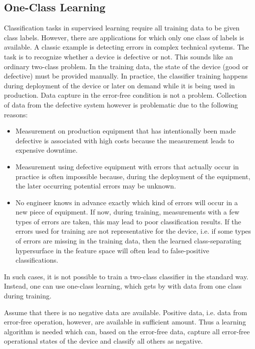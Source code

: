 \documentclass[10pt]{book}
\begin{document}
\subsection{One-Class Learning}
Classification tasks in supervised learning require all training data to be given class labels. However, there are applications for which only one class of labels is available. A classic example is detecting errors in complex technical systems. The task is to recognize whether a device is defective or not. This sounds like an ordinary two-class problem. In the training data, the state of the device (good or defective) must be provided manually. In practice, the classifier training happens during deployment of the device or later on demand while it is being used in production. Data capture in the error-free condition is not a problem. Collection of data from the defective system however is problematic due to the following reasons:
\begin{itemize}
  \item Measurement on production equipment that has intentionally been made defective is associated with high costs because the measurement leads to expensive downtime.
  \item Measurement using defective equipment with errors that actually occur in practice is often impossible because, during the deployment of the equipment, the later occurring potential errors may be unknown.
  \item No engineer knows in advance exactly which kind of errors will occur in a new piece of equipment. If now, during training, measurements with a few types of errors are taken, this may lead to poor classification results. If the errors used for training are not representative for the device, i.e. if some types of errors are missing in the training data, then the learned class-separating hypersurface in the feature space will often lead to false-positive classifications.
\end{itemize}
In such cases, it is not possible to train a two-class classifier in the standard way. Instead, one can use one-class learning, which gets by with data from one class during training.

Assume that there is no negative data are available. Positive data, i.e. data from error-free operation, however, are available in sufficient amount. Thus a learning algorithm is needed which can, based on the error-free data, capture all error-free operational states of the device and classify all others as negative.
\end{document}
